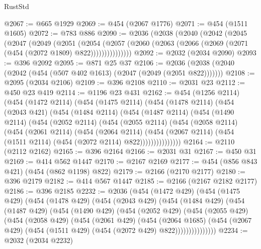 \begin{lexlean}{RustStd}
\begin{coremodule}
@2067 := @665 @1929
@2069 := @454 (@2067 @1776)
@2071 := @454 (@1511 @1605)
@2072 := @783 @886
@2090 := @2036
    (@2038
      (@2040
        (@2042
          (@2045
            (@2047
              (@2049
                (@2051
                  (@2054
                    (@2057
                      (@2060 (@2063 (@2066 (@2069 (@2071 (@454 (@2072 @1809) @822)))))))))))))))
@2092 := @2032 (@2034 @2090)
@2093 := @396 @2092
@2095 := @871 @25 @37
@2106 := @2036 (@2038 (@2040 (@2042 (@454 (@507 @402 @1613) (@2047 (@2049 (@2051 @822)))))))
@2108 := @2095 (@2034 @2106)
@2109 := @396 @2108
@2110 := @2031 @23
@2112 := @450 @23 @419
@2114 := @1196 @23 @431
@2162 := @454
    (@1256 @2114)
    (@454
      (@1472 @2114)
      (@454
        (@1475 @2114)
        (@454
          (@1478 @2114)
          (@454
            (@2043 @421)
            (@454
              (@1484 @2114)
              (@454
                (@1487 @2114)
                (@454
                  (@1490 @2114)
                  (@454
                    (@2052 @2114)
                    (@454
                      (@2055 @2114)
                      (@454
                        (@2058 @2114)
                        (@454
                          (@2061 @2114)
                          (@454
                            (@2064 @2114)
                            (@454
                              (@2067 @2114)
                              (@454 (@1511 @2114) (@454 (@2072 @2114) @822)))))))))))))))
@2164 := @2110 (@2112 @2162)
@2165 := @396 @2164
@2166 := @2031 @31
@2167 := @450 @31
@2169 := @414 @562 @1447
@2170 := @2167 @2169
@2177 := @454 (@856 @843 @421) (@454 (@862 @1198) @822)
@2179 := @2166 (@2170 @2177)
@2180 := @396 @2179
@2182 := @414 @567 @1447
@2185 := @2166 (@2167 @2182 @2177)
@2186 := @396 @2185
@2232 := @2036
    (@454
      (@1472 @429)
      (@454
        (@1475 @429)
        (@454
          (@1478 @429)
          (@454
            (@2043 @429)
            (@454
              (@1484 @429)
              (@454
                (@1487 @429)
                (@454
                  (@1490 @429)
                  (@454
                    (@2052 @429)
                    (@454
                      (@2055 @429)
                      (@454
                        (@2058 @429)
                        (@454
                          (@2061 @429)
                          (@454
                            (@2064 @1685)
                            (@454
                              (@2067 @429)
                              (@454 (@1511 @429) (@454 (@2072 @429) @822)))))))))))))))
@2234 := @2032 (@2034 @2232)

\end{coremodule}
\end{lexlean}

